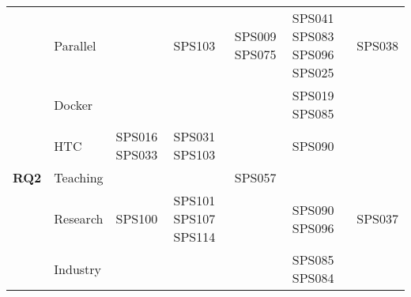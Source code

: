 \begin{table*}[htbp]
\begin{tabularx}{\textwidth}{p{0.8cm}p{2.5cm}>{\raggedright\arraybackslash}X>{\raggedright\arraybackslash}X>{\raggedright\arraybackslash}X>{\raggedright\arraybackslash}X>{\raggedright\arraybackslash}X}
		\addlinespace[0.3em]
		                                     & Parallel                &                      & SPS103               & SPS009 SPS075        & SPS041 SPS083 SPS096 SPS025        & SPS038             \\
		\addlinespace[0.3em]
		                                     & Docker                  &                      &                      &                      & SPS019 SPS085                      &                    \\
		\addlinespace[0.3em]
		                                     & HTC                     & SPS016 SPS033        & SPS031 SPS103        &                      & SPS090                             &                    \\
		\midrule
		\multirow{0}{*}[1.2em]{\textbf{RQ2}} & Teaching                &                      &                      & SPS057               &                                    &                    \\
		\addlinespace[0.3em]
		                                     & Research                & SPS100               & SPS101 SPS107 SPS114 &                      & SPS090 SPS096                      & SPS037             \\
		\addlinespace[0.3em]
		                                     & Industry                &                      &                      &                      & SPS085 SPS084                      &                    \\
		\bottomrule
	\end{tabularx}
\end{table*}

